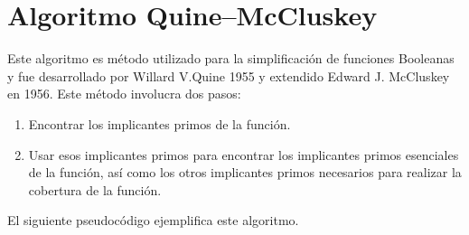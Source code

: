 \section{Algoritmo Quine–McCluskey}

Este algoritmo es método utilizado para la simplificación de funciones Booleanas y fue desarrollado por Willard V.Quine 1955 y extendido Edward J. McCluskey  en 1956. Este método involucra dos pasos:
\begin{enumerate}
	\item Encontrar los implicantes primos de la función.
	\item Usar esos implicantes primos para encontrar los implicantes primos esenciales de la función, así como los otros implicantes primos necesarios para realizar la cobertura de la función.
\end{enumerate}

El siguiente pseudocódigo ejemplifica este algoritmo.

\begin{algorithm}[h]
	\SetAlgoLined
\end{algorithm}


